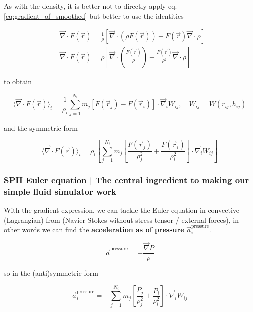 As with the density, it is better not to directly apply eq. \ref{eq:gradient_of_smoothed} but better to use the identities

\begin{equation}
    \label{eq:gradient_identities}
    \begin{aligned}
    & \vec{\nabla} \cdot F(\vec{r})=\frac{1}{\rho}[\vec{\nabla} \cdot(\rho F(\vec{r}))-F(\vec{r}) \vec{\nabla} \cdot \rho] \\
    & \vec{\nabla} \cdot F(\vec{r})=\rho\left[\vec{\nabla} \cdot\left(\frac{F(\vec{r})}{\rho}\right)+\frac{F(\vec{r})}{\rho^2} \vec{\nabla} \cdot \rho\right]
    \end{aligned}
\end{equation}

to obtain

\begin{equation}
    \label{eq:gradient_1}
    \langle\vec{\nabla} \cdot F(\vec{r})\rangle_i=\frac{1}{\rho_i} \sum_{j=1}^{N_i} m_j\left[F\left(\vec{r}_j\right)-F\left(\vec{r}_i\right)\right] \cdot \vec{\nabla}_i W_{i j}, \quad W_{i j}=W\left(r_{i j}, h_{i j}\right)
\end{equation}

and the symmetric form

\begin{equation}
    \langle\vec{\nabla} \cdot F(\vec{r})\rangle_i=\rho_i\left[\sum_{j=1}^{N_i} m_j\left[\frac{F\left(\vec{r}_j\right)}{\rho_j^2}+\frac{F\left(\vec{r}_i\right)}{\rho_i^2}\right] \cdot \vec{\nabla}_i W_{i j}\right]
\end{equation}

\subsubsection{SPH Euler equation | The central ingredient to making our simple fluid simulator work}

With the gradient-expression, we can tackle the Euler equation in convective (Lagrangian) from (Navier-Stokes without stress tensor / external forces),
in other words we can find the \textbf{acceleration as of pressure } $\vec{a}_i^{\text{pressure}}$.

\begin{equation}
    \vec{a}^{\text{pressure}} = -\frac{\vec{\nabla}P}{\rho}
\end{equation}

so in the (anti)symmetric form

\begin{equation}
    \boxed{\vec{a}_i^{\text{pressure}} = -\sum_{j=1}^{N_i} m_j\left[\frac{P_j}{\rho_j^2}+\frac{P_i}{\rho_i^2}\right] \cdot \vec{\nabla}_i W_{i j}}
\end{equation}

